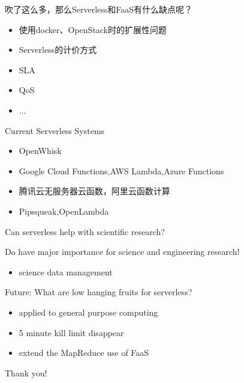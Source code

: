 \documentclass{beamer}
\begin{document}
    \begin{frame}吹了这么多，那么Serverless和FaaS有什么缺点呢？
        \begin{itemize}
        	\item 使用docker、OpenStack时的扩展性问题
        	\item Serverless的计价方式
        	\item SLA
        	\item QoS
        	\item ...
        \end{itemize}
    \end{frame}
    
    \begin{frame}Current Serverless Systems
        \begin{itemize}
        	\item OpenWhisk
        	\item Google Cloud Functions,AWS Lambda,Azure Functions
        	\item 腾讯云无服务器云函数，阿里云函数计算
        	\item Pipsqueak,OpenLambda
        \end{itemize}
    \end{frame}

    \begin{frame}Can serverless help with scientific research?
    	
        Do have major importance for science and engineering research!
        \begin{itemize}
        	\item science data management
        \end{itemize}
    \end{frame}
    
    \begin{frame}Future: What are low hanging fruits for serverless?
    	\begin{itemize}
    		\item applied to general purpose computing
    		\item 5 minute kill limit disappear
    		\item extend the MapReduce use of FaaS
    	\end{itemize}
        
    \end{frame}

    \begin{frame}
        \centering Thank you!
    \end{frame}
\end{document}
